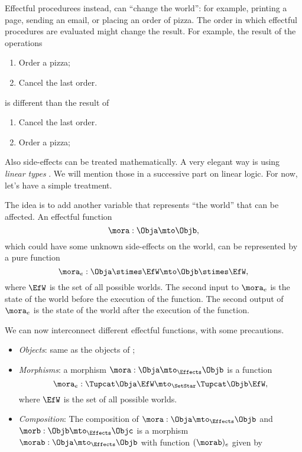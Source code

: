 Effectful procedurees instead, can ``change the world'': for example, printing a page, sending an email, or placing an order of pizza. The order in which effectful procedures are evaluated might change the result. For example, the result of the operations 
% 
\begin{enumerate}
\item Order a pizza;
\item Cancel the last order.
\end{enumerate}
% 
is different than the result of 
% 
\begin{enumerate}
    \item Cancel the last order.
    \item Order a pizza;
\end{enumerate}

Also side-effects can be treated mathematically. 
A very elegant way is using \emph{linear types} \XXX. 
We will mention those in a successive part on linear logic. 
For now, let's have a simple treatment.

The idea is to add another variable that represents ``the world'' that can be affected. 
An effectful function 
\begin{equation}
    \mora: \Obja \mto \Objb,
\end{equation}
which could have some unknown side-effects on the world, can be represented by a pure function 
% 
\begin{equation}
    \mora_e:  \Obja \stimes \EfW \mto   \Objb \stimes \EfW,
\end{equation}
% 
where $\EfW$ is the set of all possible worlds. 
The second input to $\mora_e$ is the state of the world before the execution of the function. 
The second output of $\mora_e$ is the state of the world after the execution of the function. 

We can now interconnect different effectful functions, with some precautions.

\begin{definition}[\Effects]
    \begin{itemize}
        \item \emph{Objects}: same as the objects of \SetStar;
        \item \emph{Morphisms}: a morphism $\mora: \Obja \mto_{\Effects} \Objb$ is a function 
        \begin{equation}
            \mora_e: \Tupcat \Obja \EfW \mto_{\SetStar} \Tupcat \Objb \EfW,
        \end{equation}
        where $\EfW$ is the set of all possible worlds. 
        \item \emph{Composition}: The composition of  $\mora: \Obja \mto_{\Effects} \Objb$ and 
        $\morb: \Objb \mto_{\Effects} \Objc$ is a morphism $\morab: \Obja \mto_{\Effects} \Objb$ with function $(\morab)_e$ given by 
    \end{itemize}
\end{definition}


